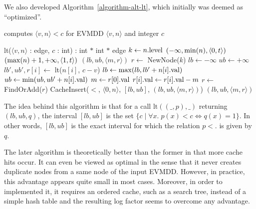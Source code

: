 \documentclass[a4paper,oneside,11pt,pdftex]{llncs}
\newcommand{\BLANK}{\STATE \vspace{-0.6em}}
\newcommand{\edge}[2]{\langle #1, #2 \rangle}
\newcommand{\val}[1]{#1{\rm .val}}
\newcommand{\level}[1]{#1{\rm .level}}
\begin{document}
We also developed Algorithm~\vref{algorithm-alt-lt}, which initially was deemed as ``optimized''.
\begin{algorithm}[htbp]
  \caption{computes $\edge{v}{n} < c$ for EVMDD $\edge{v}{n}$ and integer $c$}
  \label{algorithm-alt-lt}
  \begin{algorithmic}
    \item[lt($\edge{v}{n}$ : edge, $c$ : int) : int $*$ int $*$ edge]
    \STATE $k \gets \level{n}$
    \BLANK
    \STATE {}
      \RETURN $(-\infty, {\rm min}(n), \edge{0}{t})$ 
    \ENDIF
      \RETURN $({\rm max}(n)+1, +\infty, \edge{1}{t})$ 
    \ENDIF
    \BLANK
    \STATE {}
    \IF{CacheFind($<$, $\edge{0}{n}$, $c-v$, $(lb, ub, \edge{m}{r})$)}
      \RETURN $(lb, ub, \edge{m}{r})$
    \ENDIF
    \BLANK
    \STATE $r \gets$ NewNode($k$)
    \STATE $lb \gets -\infty$
    \STATE $ub \gets +\infty$
      \STATE $lb', ub', r[i] \gets$ lt($n[i]$, $c-v$)
      \STATE $lb \gets {\rm max}(lb, lb'+\val{n[i]})$
      \STATE $ub \gets {\rm min}(ub, ub'+\val{n[i]})$
    \ENDFOR
    \STATE $m \gets \val{r[0]}$
      \STATE $\val{r[i]} \gets \val{r[i]}-m$
    \ENDFOR
    \BLANK
    \STATE {}
    \STATE $r \gets$ FindOrAdd($r$)
    \BLANK
    \STATE {}
    \STATE CacheInsert($<$, $\edge{0}{n}$, $[lb, ub]$, $(lb, ub, \edge{m}{r})$)
    \BLANK
    \RETURN $(lb, ub, \edge{m}{r})$
  \end{algorithmic}
\end{algorithm}
The idea behind this algorithm is that
for a call $\mathrm{lt}((\_, p), \_)$ returning $(lb, ub, q)$, the 
interval $[lb, ub]$ is the set $\{c \;|\; \forall x.\; 
p\left(x\right) < c \Leftrightarrow 
q\left(x\right) = 1\}$. In other words, $[lb, ub]$
is the exact interval for which the relation $p < .$ is given by $q$.

The later algorithm is theoretically better than the former in that
more cache hits occur. It can even be viewed as optimal in the sense that
it never creates duplicate nodes from a same node of the input EVMDD.
However, in practice, this advantage appears quite small in most cases.
Moreover, in order to implemented it, it requires an ordered cache, such as a search tree,
instead of a simple hash table and the resulting log factor seems to overcome
any advantage.
\end{document}
